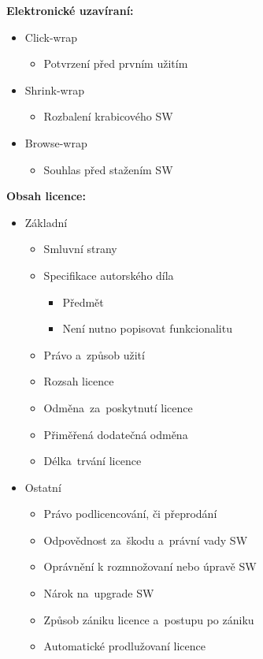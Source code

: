 \noindent\textbf{Elektronické uzavíraní:}
\begin{itemize}[noitemsep]
    \item Click-wrap
    \begin{itemize}[noitemsep]
        \item Potvrzení před prvním užitím
    \end{itemize}
    \item Shrink-wrap
    \begin{itemize}[noitemsep]
        \item Rozbalení krabicového SW
    \end{itemize}
    \item Browse-wrap
    \begin{itemize}[noitemsep]
        \item Souhlas před stažením SW
    \end{itemize}
\end{itemize}

\noindent\textbf{Obsah licence:}
\begin{itemize}[noitemsep]
    \item Základní
    \begin{itemize}[noitemsep]
        \item Smluvní strany
        \item Specifikace autorského díla
        \begin{itemize}[noitemsep]
            \item Předmět
            \item Není nutno popisovat funkcionalitu
        \end{itemize}
        \item Právo a~způsob užití
        \item Rozsah licence
        \item Odměna~za~poskytnutí licence
        \item Přiměřená dodatečná odměna
        \item Délka~trvání licence
    \end{itemize}
    \item Ostatní
    \begin{itemize}[noitemsep]
        \item Právo podlicencování, či přeprodání
        \item Odpovědnost za~škodu a~právní vady SW
        \item Oprávnění k rozmnožovaní nebo úpravě SW
        \item Nárok na~upgrade SW
        \item Způsob zániku licence a~postupu po zániku
        \item Automatické prodlužovaní licence
    \end{itemize}
\end{itemize}

